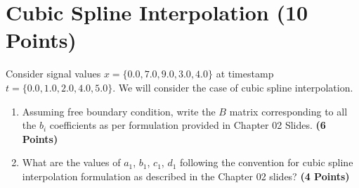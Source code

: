 \documentclass[12pt, xcolor=dvipsnames,svgnames,x11names]{article}
\begin{document}
\section{Cubic Spline Interpolation (10 Points)}

Consider signal values $x = \{0.0, 7.0, 9.0, 3.0, 4.0\}$ at timestamp $t = \{ 0.0, 1.0, 2.0, 4.0, 5.0\}$.  We will consider the case of cubic spline interpolation.

\begin{enumerate}
\item Assuming free boundary condition, write the $B$ matrix corresponding to all the $b_i$ coefficients as per formulation provided in Chapter 02 Slides. \textbf{(6 Points)}

\item What are the values of $a_1$, $b_1$, $c_1$, $d_1$ following the convention for cubic spline interpolation formulation as described in the Chapter 02 slides? \textbf{(4 Points)}

\end{enumerate}
\end{document}

